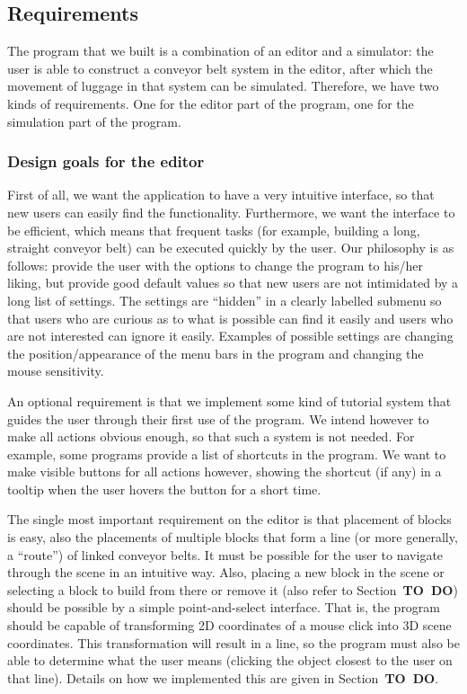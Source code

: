 \subsection{Requirements}
The program that we built is a combination of an editor and a simulator: the user is able to construct a conveyor belt system in the editor, after which the movement of luggage in that system can be simulated. Therefore, we have two kinds of requirements. One for the editor part of the program, one for the simulation part of the program.

\subsubsection{Design goals for the editor}
\label{subsubsec:design-goals-editor}
First of all, we want the application to have a very intuitive interface, so that new users can easily find the functionality. Furthermore, we want the interface to be efficient, which means that frequent tasks (for example, building a long, straight conveyor belt) can be executed quickly by the user. Our philosophy is as follows: provide the user with the options to change the program to his/her liking, but provide good default values so that new users are not intimidated by a long list of settings. The settings are ``hidden'' in a clearly labelled submenu so that users who are curious as to what is possible can find it easily and users who are not interested can ignore it easily. Examples of possible settings are changing the position/appearance of the menu bars in the program and changing the mouse sensitivity.

An optional requirement is that we implement some kind of tutorial system that guides the user through their first use of the program. We intend however to make all actions obvious enough, so that such a system is not needed. For example, some programs provide a list of shortcuts in the program. We want to make visible buttons for all actions however, showing the shortcut (if any) in a tooltip when the user hovers the button for a short time.

The single most important requirement on the editor is that placement of blocks is easy, also the placements of multiple blocks that form a line (or more generally, a ``route'') of linked conveyor belts. It must be possible for the user to navigate through the scene in an intuitive way. Also, placing a new block in the scene or selecting a block to build from there or remove it (also refer to Section~\textbf{TO~DO}) should be possible by a simple point-and-select interface. That is, the program should be capable of transforming 2D coordinates of a mouse click into 3D scene coordinates. This transformation will result in a line, so the program must also be able to determine what the user means (clicking the object closest to the user on that line). Details on how we implemented this are given in Section~\textbf{TO~DO}.

